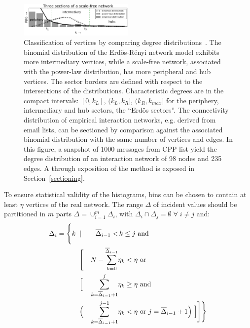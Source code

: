 \documentclass[%
	aip,
	jmp,%
	amsmath,amssymb,
	reprint,%
]{revtex4-1}
\begin{document}
\begin{figure}[!h]
	\centering
	\includegraphics[width=0.5\textwidth]{figs/fser__}
	\caption{Classification of vertices by comparing degree
		distributions~\cite{3setores}.
		The binomial distribution of the Erd\"os-R\'enyi network model exhibits more intermediary vertices,
		while a scale-free network, associated with the power-law distribution,
		has more peripheral and hub vertices.
		The sector borders are defined with respect to the intersections of the distributions.
Characteristic degrees are in the compact intervals: $[0,k_L]$, $(k_L,k_R]$, $(k_R,k_{max}]$ for the periphery,
intermediary and hub sectors, the ``Erd\"os sectors''.
		The connectivity distribution of empirical interaction networks, e.g. derived from email lists,
		can be sectioned by comparison against the associated binomial distribution with the same number of vertices and edges.
		In this figure, a snapshot of 1000 messages from CPP list yield the degree distribution
		of an interaction network of 98 nodes and 235 edges.
		A through exposition of the method is exposed in Section~\ref{sectioning}.}
		\label{fig:setores}
\end{figure}
To ensure statistical validity of the histograms, bins can be chosen to contain at least $\eta$ vertices of the real network.
The range $\Delta$ of incident values should be partitioned in $m$ parts $\Delta=\cup_{i=1}^m \Delta_i$,
with $\Delta_i\cap \Delta_j=\emptyset \; \forall\; i \neq j$ and:
\begin{align}
\Delta_i =\Biggl\{ k\;\; & | & \overline{\Delta}_{i-1}< &\, k\leq j \text{ and }\;\;\;\;\;\;\;\;\;\;\;\;\nonumber\\
		      & \Biggl[ & N - \sum_{k=0}^{\overline{\Delta}_{i-1}} & \eta_k< \eta \text{ or }\\
&	\Bigl[ & \sum_{k=\overline{\Delta}_{i-1}+1}^j &  \eta_k \geq \eta \text{ and }\;\;\;\;\;\;\nonumber\\
& \Bigl( &\sum_{k=\overline{\Delta}_{i-1}+1}^{j-1} &  \eta_k < \eta \text{ or }   j=\overline{\Delta}_{i-1}+1 \Bigr) \;\Bigr] \Biggr] \Biggr\}\nonumber
\end{align}
	
\end{document}
